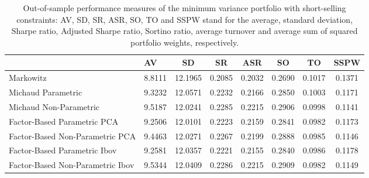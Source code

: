\begin{table}

\caption{\label{tab:ssc_mvp}Out-of-sample performance measures of the minimum variance portfolio with short-selling constraints: AV, SD, SR, ASR, SO, TO and SSPW stand for the average, standard deviation, Sharpe ratio, Adjusted Sharpe ratio, Sortino ratio, average turnover and average sum of squared portfolio weights, respectively.}
\centering
\begin{tabular}[t]{l|l|c|c|c|c|c|c}
\hline
  & AV & SD & SR & ASR & SO & TO & SSPW\\
\hline
Markowitz & 8.8111 & 12.1965 & 0.2085 & 0.2032 & 0.2690 & 0.1017 & 0.1371\\
\hline
Michaud Parametric & 9.3232 & 12.0571 & 0.2232 & 0.2166 & 0.2850 & 0.1003 & 0.1171\\
\hline
Michaud Non-Parametric & 9.5187 & 12.0241 & 0.2285 & 0.2215 & 0.2906 & 0.0998 & 0.1141\\
\hline
Factor-Based Parametric PCA & 9.2506 & 12.0101 & 0.2223 & 0.2159 & 0.2841 & 0.0982 & 0.1173\\
\hline
Factor-Based Non-Parametric PCA & 9.4463 & 12.0271 & 0.2267 & 0.2199 & 0.2888 & 0.0985 & 0.1146\\
\hline
Factor-Based Parametric Ibov & 9.2581 & 12.0357 & 0.2221 & 0.2155 & 0.2840 & 0.0986 & 0.1178\\
\hline
Factor-Based Non-Parametric Ibov & 9.5344 & 12.0409 & 0.2286 & 0.2215 & 0.2909 & 0.0982 & 0.1149\\
\hline
\end{tabular}
\end{table}
